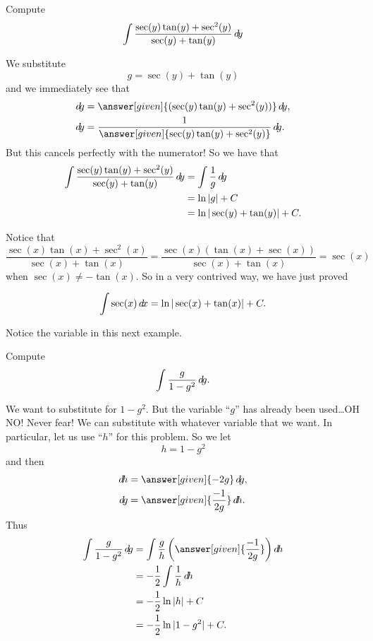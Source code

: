 \documentclass{ximera}
\begin{document}
\begin{example}
Compute
\[
\int \frac{\sec(y) \tan(y) + \sec^2(y)}{\sec(y) + \tan(y)} \mathop{}\!d\! y
\]
\begin{explanation}
We substitute
\[
g = \sec(y) + \tan(y)
\]
and we immediately see that
\begin{align*}
  \d g &= \answer[given]{(\sec(y) \tan(y) + \sec^2(y))} \d y,\\
  \d y &= \frac{1}{\answer[given]{\sec(y) \tan(y) + \sec^2(y)}} \d g.
\end{align*}
But this cancels perfectly with the numerator!  
So we have that
\begin{align*}
\int \frac{\sec(y) \tan(y) + \sec^2(y)}{\sec(y) + \tan(y)} \mathop{}\!d\! y &= \int \frac{1}{g} \mathop{}\!d\! g  \\
&= \ln|g| + C  \\
&= \ln| \sec(y) + \tan(y) | + C.
\end{align*}
\end{explanation}
\end{example}



Notice that 
\[
\frac{\sec(x) \tan(x) + \sec^2(x)}{\sec(x) + \tan(x)} = \frac{\sec(x) (\tan(x) + \sec(x))}{\sec(x) + \tan(x)} = \sec(x)
\]
when $\sec(x) \neq - \tan(x)$.  
So in a very contrived way, we have just proved

\begin{theorem}
\[
\int \sec(x) \mathop{}\!d\! x = \ln|\sec(x) + \tan(x)| + C.
\]
\end{theorem}


Notice the variable in this next example.


\begin{example}\label{key example}
Compute
\[
\int \frac{g}{1-g^2} \mathop{}\!d\! g.
\]
\begin{explanation}
We want to substitute for $1-g^2$.  
But the variable ``$g$'' has already been used\dots OH NO!
Never fear! We can substitute with whatever variable that we want.  
In particular, let us use ``$h$'' for this problem.  
So we let
\[
h = 1 - g^2
\]
and then
\begin{align*}
  \d h &= \answer[given]{-2g} \d g,\\
  \d g &= \answer[given]{\frac{-1}{2g}} \d h.
\end{align*}
Thus
\begin{align*}
\int \frac{g}{1-g^2} \d g &= \int \frac{g}{h} \left( \answer[given]{\frac{-1}{2g}} \right) \d h  \\
&= - \frac{1}{2} \int \frac{1}{h} \d h  \\
&= - \frac{1}{2} \ln|h| + C  \\
&= - \frac{1}{2} \ln|1-g^2| + C.
\end{align*}
\end{explanation}
\end{example}
\end{document}
